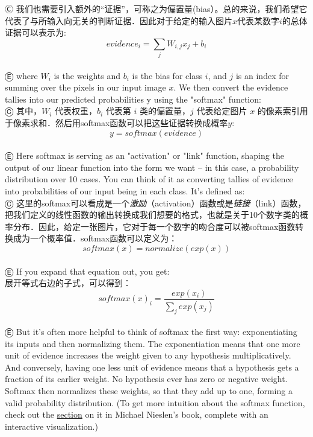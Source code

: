 Ⓒ 我们也需要引入额外的“证据”，可称之为偏置量(bias）。总的来说，我们希望它代表了与所输入向无关的判断证据．因此对于给定的输入图片$x$代表某数字$i$的总体证据可以表示为:
\begin{equation}
evidence_i = \sum_j{W_{i,j}}x_j+b_i
\end{equation}\\
Ⓔ where $W_i$ is the weights and $b_i$ is the bias for class $i$, and $j$ is an index for summing over the pixels in our input image $x$. We then convert the evidence tallies into our predicted probabilities y using the "softmax" function:\\
Ⓒ 其中，$W_i$ 代表权重，$b_i$ 代表第 $i$ 类的偏置量，$j$ 代表给定图片 $x$ 的像素索引用于像素求和．然后用softmax函数可以把这些证据转换成概率$y$:\\
\begin{equation}
y = softmax(evidence)
\end{equation}\\
Ⓔ Here softmax is serving as an "activation" or "link" function, shaping the output of our linear function into the form we want -- in this case, a probability distribution over 10 cases. You can think of it as converting tallies of evidence into probabilities of our input being in each class. It's defined as:\\
Ⓒ 这里的softmax可以看成是一个\emph{激励}（activation）函数或是\emph{链接}（link）函数，把我们定义的线性函数的输出转换成我们想要的格式，也就是关于10个数字类的概率分布．因此，给定一张图片，它对于每一个数字的吻合度可以被softmax函数转换成为一个概率值．softmax函数可以定义为：\\
\begin{equation}
softmax(x) = normalize(exp(x))
\end{equation}\\
Ⓔ If you expand that equation out, you get:\\
展开等式右边的子式，可以得到：\\
\begin{equation}
softmax(x)_i = \frac{exp(x_i)}{\sum_j{exp(x_j)}}
\end{equation}\\
Ⓔ But it's often more helpful to think of softmax the first way: exponentiating its inputs and then normalizing them. The exponentiation means that one more unit of evidence increases the weight given to any hypothesis multiplicatively. And conversely, having one less unit of evidence means that a hypothesis gets a fraction of its earlier weight. No hypothesis ever has zero or negative weight. Softmax then normalizes these weights, so that they add up to one, forming a valid probability distribution. (To get more intuition about the softmax function, check out the \href{http://neuralnetworksanddeeplearning.com/chap3.html#softmax}{section} on it in Michael Nieslen's book, complete with an interactive visualization.)\\
